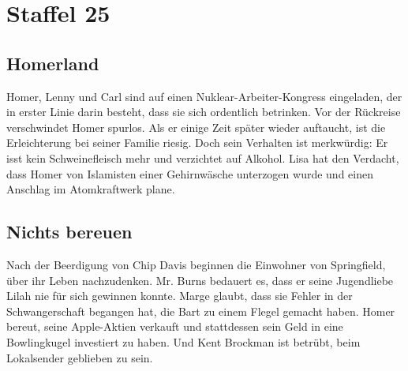 \section{Staffel 25}

\subsection{Homerland}
Homer, Lenny und Carl sind auf einen Nuklear-Arbeiter-Kongress eingeladen, der in erster Linie darin besteht, dass sie sich ordentlich betrinken. Vor der Rückreise verschwindet Homer spurlos. Als er einige Zeit später wieder auftaucht, ist die Erleichterung bei seiner Familie riesig. Doch sein Verhalten ist merkwürdig: Er isst kein Schweinefleisch mehr und verzichtet auf Alkohol. Lisa hat den Verdacht, dass Homer von Islamisten einer Gehirnwäsche unterzogen wurde und einen Anschlag im Atomkraftwerk plane.


\subsection{Nichts bereuen}\label{RABF18}
Nach der Beerdigung von Chip Davis beginnen die Einwohner von Springfield, über ihr Leben nachzudenken. Mr. Burns bedauert es, dass er seine Jugendliebe Lilah nie für sich gewinnen konnte. Marge glaubt, dass sie Fehler in der Schwangerschaft begangen hat, die Bart zu einem Flegel gemacht haben. Homer bereut, seine Apple-Aktien verkauft und stattdessen sein Geld in eine Bowlingkugel investiert zu haben. Und Kent Brockman ist betrübt, beim Lokalsender geblieben zu sein.


